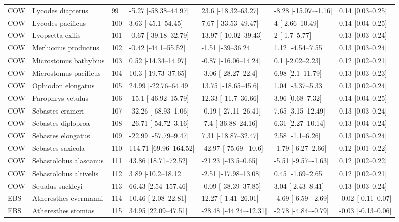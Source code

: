 \begin{longtable}[t]{lllllll}
COW & Lycodes diapterus & 99 & -5.27 [-58.38–44.97] & 23.6 [-18.32–63.27] & -8.28 [-15.07–-1.16] & 0.14 [0.03–0.25]\\
COW & Lycodes pacificus & 100 & 3.63 [-45.1–54.45] & 7.67 [-33.53–49.47] & 4 [-2.66–10.49] & 0.14 [0.04–0.25]\\
\addlinespace
COW & Lyopsetta exilis & 101 & -0.67 [-39.18–32.79] & 13.97 [-10.02–39.43] & 2 [-1.7–5.77] & 0.13 [0.03–0.24]\\
COW & Merluccius productus & 102 & -0.42 [-44.1–55.52] & -1.51 [-39–36.24] & 1.12 [-4.54–7.55] & 0.13 [0.03–0.24]\\
COW & Microstomus bathybius & 103 & 0.52 [-14.34–14.97] & -0.87 [-16.06–14.24] & 0.1 [-2.02–2.23] & 0.12 [0.02–0.21]\\
COW & Microstomus pacificus & 104 & 10.3 [-19.73–37.65] & -3.06 [-28.27–22.4] & 6.98 [2.1–11.79] & 0.13 [0.03–0.23]\\
COW & Ophiodon elongatus & 105 & 24.99 [-22.76–64.49] & 13.75 [-18.65–45.6] & 1.04 [-3.37–5.33] & 0.13 [0.02–0.24]\\
\addlinespace
COW & Parophrys vetulus & 106 & -15.1 [-46.92–15.79] & 12.33 [-11.7–36.66] & 3.96 [0.68–7.32] & 0.14 [0.04–0.25]\\
COW & Sebastes crameri & 107 & -32.26 [-68.93–1.06] & -0.19 [-27.11–26.41] & 7.65 [3.15–12.49] & 0.13 [0.03–0.24]\\
COW & Sebastes diploproa & 108 & -26.71 [-54.72–3.16] & -7.4 [-36.88–24.16] & 6.31 [2.27–10.14] & 0.13 [0.04–0.24]\\
COW & Sebastes elongatus & 109 & -22.99 [-57.79–9.47] & 7.31 [-18.87–32.47] & 2.58 [-1.1–6.26] & 0.13 [0.03–0.24]\\
COW & Sebastes saxicola & 110 & 114.71 [69.96–164.52] & -42.97 [-75.69–-10.6] & -1.79 [-6.27–2.66] & 0.12 [0.01–0.22]\\
\addlinespace
COW & Sebastolobus alascanus & 111 & 43.86 [18.71–72.52] & -21.23 [-43.5–0.65] & -5.51 [-9.57–-1.63] & 0.12 [0.02–0.22]\\
COW & Sebastolobus altivelis & 112 & 3.89 [-10.2–18.12] & -2.51 [-17.98–13.08] & 0.45 [-1.69–2.65] & 0.12 [0.02–0.21]\\
COW & Squalus suckleyi & 113 & 66.43 [2.54–157.46] & -0.09 [-38.39–37.85] & 3.04 [-2.43–8.41] & 0.13 [0.03–0.24]\\
EBS & Atheresthes evermanni & 114 & 10.46 [-2.08–22.81] & 12.27 [-1.41–26.01] & -4.69 [-6.59–-2.69] & -0.02 [-0.11–0.07]\\
EBS & Atheresthes stomias & 115 & 34.95 [22.09–47.51] & -28.48 [-44.24–-12.31] & -2.78 [-4.84–-0.79] & -0.03 [-0.13–0.06]\\

\end{longtable}
